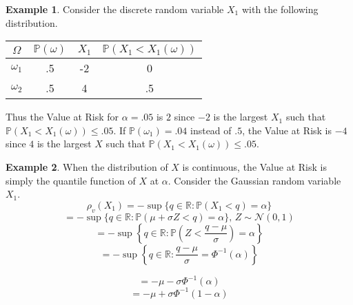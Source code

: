 \documentclass[12pt]{article}
\theoremstyle{definition}
\newtheorem{example}{Example}
\begin{document}
\begin{example}

Consider the discrete random variable \(X_1\) with the following distribution.

\begin{center}
\begin{tabular}{c| c c c}
\(\Omega\) & \(\mathbb{P}(\omega)\) & \(X_1\) & \(\mathbb{P}(X_1 < X_1(\omega))\) \\
\hline
\(\omega_1\) & .5 & -2 & 0 \\
\(\omega_2\) & .5 & 4 & .5\\
\end{tabular}
\end{center}

Thus the Value at Risk for \(\alpha=.05\) is \(2\) since \(-2\) is the largest \(X_1\) such that \(\mathbb{P}(X_1 < X_1(\omega))\leq .05\).  If \(\mathbb{P}(\omega_1)=.04\) instead of \(.5\), the Value at Risk is \(-4\) since \(4\) is the largest \(X\) such that \(\mathbb{P}(X_1 < X_1 (\omega))\leq .05\).
\end{example}

\begin{example}
When the distribution of \(X\) is continuous, the Value at Risk is simply the quantile function of \(X\) at \(\alpha\).  Consider the Gaussian random variable \(X_1\). \[\rho_v(X_1)=-\sup{ \{q \in \mathbb{R}:\mathbb{P}(X_1< q) = \alpha \}}\]
\[ =  -\sup{ \{q \in \mathbb{R}:\mathbb{P}(\mu+\sigma Z < q) = \alpha \}}, \,Z \sim \mathcal{N}(0, 1)  \]
\[=-\sup{ \left\{q \in \mathbb{R}:\mathbb{P}\left(Z <\frac{q-\mu}{\sigma}\right) = \alpha \right\}}\]
\[=-\sup{ \left\{q \in \mathbb{R}:\frac{q-\mu}{\sigma} = \Phi^{-1}(\alpha) \right\}}\]

\[=-\mu-\sigma\Phi^{-1}(\alpha) \]
\[=-\mu+\sigma \Phi^{-1}(1-\alpha)\]
\end{example}
\end{document}

